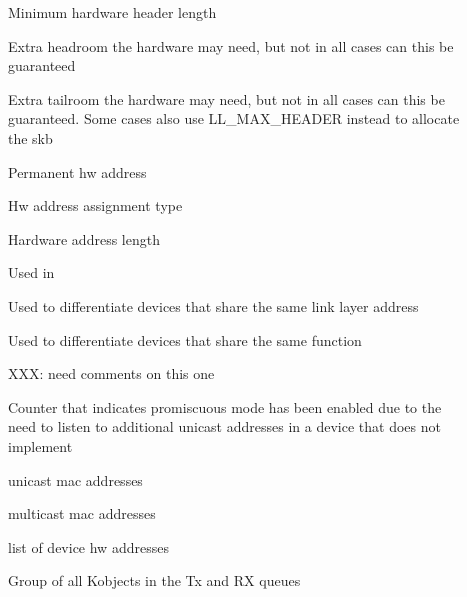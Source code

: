 \documentclass[a4paper,8pt,english]{sphinxmanual}
\begin{document}
\begin{description}
\item[{}] \leavevmode
Minimum hardware header length

\item[{}] \leavevmode
Extra headroom the hardware may need, but not in all
cases can this be guaranteed

\item[{}] \leavevmode
Extra tailroom the hardware may need, but not in all
cases can this be guaranteed. Some cases also use
LL\_MAX\_HEADER instead to allocate the skb

\item[{}] \leavevmode
Permanent hw address

\item[{}] \leavevmode
Hw address assignment type

\item[{}] \leavevmode
Hardware address length

\item[{}] \leavevmode
Used in 

\item[{}] \leavevmode
Used to differentiate devices that share
the same link layer address

\item[{}] \leavevmode
Used to differentiate devices that share
the same function

\item[{}] \leavevmode
XXX: need comments on this one

\item[{}] \leavevmode
Counter that indicates promiscuous mode
has been enabled due to the need to listen to
additional unicast addresses in a device that
does not implement 

\item[{}] \leavevmode
unicast mac addresses

\item[{}] \leavevmode
multicast mac addresses

\item[{}] \leavevmode
list of device hw addresses

\item[{}] \leavevmode
Group of all Kobjects in the Tx and RX queues


\end{description}
\end{document}
